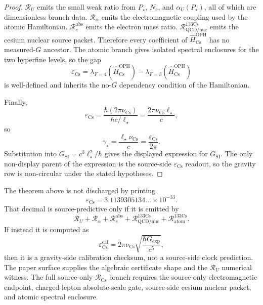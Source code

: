 \begin{proof}
\(\mathcal R_U\) emits the small weak ratio from \(P_\star\), \(N_c\), and
\(\alpha_U(P_\star)\), all of which are dimensionless branch data. \(\mathcal R_\alpha\) emits
the electromagnetic coupling used by the atomic Hamiltonian. \(\mathcal R_e^{\mathrm{abs}}\)
emits the electron mass ratio. \(\mathcal R_{\mathrm{QCD/nuc}}^{133\mathrm{Cs}}\) emits the
cesium nuclear source packet. Therefore every coefficient of
\(\widehat H_{\mathrm{Cs}}^{\mathrm{OPH}}\) has no measured-\(G\) ancestor. The atomic branch
gives isolated spectral enclosures for the two hyperfine levels, so the gap
\[
\varepsilon_{\mathrm{Cs}}
=
\lambda_{F=4}(\widehat H_{\mathrm{Cs}}^{\mathrm{OPH}})
-
\lambda_{F=3}(\widehat H_{\mathrm{Cs}}^{\mathrm{OPH}})
\]
is well-defined and inherits the no-\(G\) dependency condition of the Hamiltonian.

Finally,
\[
\varepsilon_{\mathrm{Cs}}
=
\frac{\hbar(2\pi\nu_{\mathrm{Cs}})}{\hbar c/\ell_\star}
=
\frac{2\pi\nu_{\mathrm{Cs}}\ell_\star}{c},
\]
so
\[
\gamma_\star=\frac{\ell_\star\nu_{\mathrm{Cs}}}{c}
=
\frac{\varepsilon_{\mathrm{Cs}}}{2\pi}.
\]
Substitution into \(G_{\mathrm{SI}}=c^3\ell_\star^2/\hbar\) gives the displayed expression
for \(G_{\mathrm{SI}}\). The only non-display parent of the expression is the source-side
\(\varepsilon_{\mathrm{Cs}}\) readout, so the gravity row is non-circular under the stated
hypotheses.
\end{proof}

\begin{remark}\label{rem:cs-clock-boundary}
The theorem above is not discharged by printing
\[
\varepsilon_{\mathrm{Cs}}
=
3.1139305134\ldots\times10^{-33}.
\]
That decimal is source-predictive only if it is emitted by
\[
\mathcal R_U
+
\mathcal R_\alpha
+
\mathcal R_e^{\mathrm{abs}}
+
\mathcal R_{\mathrm{QCD/nuc}}^{133\mathrm{Cs}}
+
\mathcal R_{\mathrm{atom}}^{133\mathrm{Cs}}.
\]
If instead it is computed as
\[
\varepsilon_{\mathrm{Cs}}^{\mathrm{cal}}
=
2\pi\nu_{\mathrm{Cs}}
\sqrt{\frac{\hbar G_{\mathrm{exp}}}{c^5}},
\]
then it is a gravity-side calibration checksum, not a source-side clock prediction. The paper
surface supplies the algebraic certificate shape and the \(\mathcal R_U\) numerical witness.
The full source-only \(\mathcal R_{\mathrm{Cs}}\) branch requires the source-only
electromagnetic endpoint, charged-lepton absolute-scale gate, source-side cesium nuclear packet,
and atomic spectral enclosure.
\end{remark}

